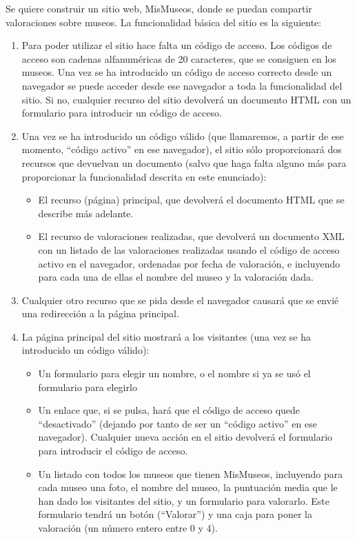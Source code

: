 Se quiere construir un sitio web, MisMuseos, donde se puedan compartir valoraciones sobre museos. La funcionalidad básica del sitio es la siguiente:

\begin{enumerate}
\item Para poder utilizar el sitio hace falta un código de acceso. Los códigos de acceso son cadenas alfanuméricas de 20 caracteres, que se consiguen en los museos. Una vez se ha introducido un código de acceso correcto desde un navegador se puede acceder desde ese navegador a toda la funcionalidad del sitio. Si no, cualquier recurso del sitio devolverá un documento HTML con un formulario para introducir un código de acceso.

\item Una vez se ha introducido un código válido (que llamaremos, a partir de ese momento, ``código activo'' en ese navegador), el sitio sólo proporcionará dos recursos que devuelvan un documento (salvo que haga falta alguno más para proporcionar la funcionalidad descrita en este enunciado):
  \begin{itemize}
  \item El recurso (página) principal, que devolverá el documento HTML que se describe más adelante.
  \item El recurso de valoraciones realizadas, que devolverá un documento XML con un listado de las valoraciones realizadas usando el código de acceso activo en el navegador, ordenadas por fecha de valoración, e incluyendo para cada una de ellas el nombre del museo y la valoración dada.
  \end{itemize}

\item Cualquier otro recurso que se pida desde el navegador causará que se envié una redirección a la página principal.

\item La página principal del sitio mostrará a los visitantes (una vez se ha introducido un código válido):
  \begin{itemize}
  \item Un formulario para elegir un nombre, o el nombre si ya se usó el formulario para elegirlo
  \item Un enlace que, si se pulsa, hará que el código de acceso quede ``desactivado'' (dejando por tanto de ser un ``código activo'' en ese navegador). Cualquier nueva acción en el sitio devolverá el formulario para introducir el código de acceso.
  \item Un listado con todos los museos que tienen MisMuseos, incluyendo para cada museo una foto, el nombre del museo, la puntuación media que le han dado los visitantes del sitio, y un formulario para valorarlo. Este formulario tendrá un botón (``Valorar'') y una caja para poner la valoración (un número entero entre 0 y 4).
  \end{itemize}


\end{enumerate}
